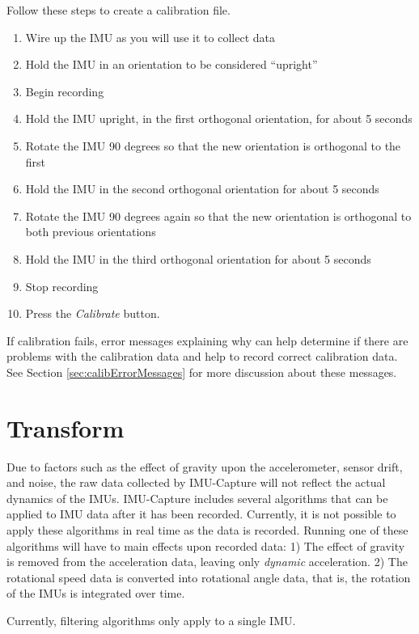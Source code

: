 \documentclass[11pt,letterpaper,article,oneside]{memoir}
\newcommand{\name}{IMU-Capture}
\begin{document}
Follow these steps to create a calibration file.

\begin{enumerate}
\item Wire up the IMU as you will use it to collect data
\item Hold the IMU in an orientation to be considered ``upright''
\item Begin recording
\item Hold the IMU upright, in the first orthogonal orientation, for about 5 seconds
\item Rotate the IMU 90 degrees so that the new orientation is orthogonal to the first
\item Hold the IMU in the second orthogonal orientation for about 5 seconds
\item Rotate the IMU 90 degrees again so that the new orientation is orthogonal to both previous orientations
\item Hold the IMU in the third orthogonal orientation for about 5 seconds
\item Stop recording
\item Press the \emph{Calibrate} button.
\end{enumerate}

If calibration fails, error messages explaining why can help determine if there
are problems with the calibration data and help to record correct calibration
data. See Section \ref{sec:calibErrorMessages} for more discussion about these
messages.




\chapter{Transform}


Due to factors such as the effect of gravity upon the accelerometer, sensor
drift, and noise, the raw data collected by \name{} will not reflect the actual
dynamics of the IMUs. \name{} includes several algorithms that can be applied to
IMU data after it has been recorded. Currently, it is not possible to apply
these algorithms in real time as the data is recorded. Running one of these
algorithms will have to main effects upon recorded data: 1) The effect of
gravity is removed from the acceleration data, leaving only \emph{dynamic}
acceleration. 2) The rotational speed data is converted into rotational angle
data, that is, the rotation of the IMUs is integrated over time.

Currently, filtering algorithms only apply to a single IMU.
\end{document}
